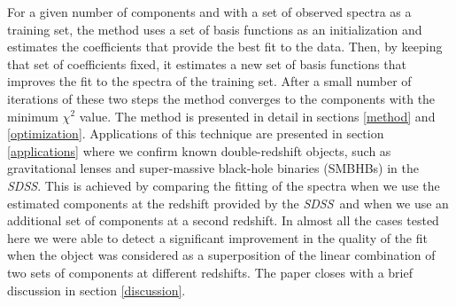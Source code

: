 \documentclass[apj]{emulateapj}
\newcommand{\project}[1]{\textsl{#1}}
\newcommand{\sdss}{\project{SDSS}}
\begin{document}
For a given number of components and with a
set of observed spectra as a training set, the method uses a set of
basis functions as an initialization and estimates the coefficients
that provide the best fit to the data. Then, by keeping that set of
coefficients fixed, it estimates a new set of basis functions that
improves the fit to the spectra of the training set. After a small
number of iterations of these two steps the method converges to the
components with the minimum $\chi^2$ value. The method is presented in
detail in sections \ref{method} and \ref{optimization}. Applications
of this technique are presented in section \ref{applications} where we
confirm known double-redshift objects, such as gravitational lenses
and super-massive black-hole binaries (SMBHBs) in the \sdss. This is
achieved by comparing the fitting of the spectra when we use the
estimated components at the redshift provided by the \sdss\ and when
we use an additional set of components at a second redshift. In almost
all the cases tested here we were able to detect a significant
improvement in the quality of the fit when the object was considered
as a superposition of the linear combination of two sets of components
at different redshifts. The paper closes with a brief discussion in
section \ref{discussion}.
\end{document}
